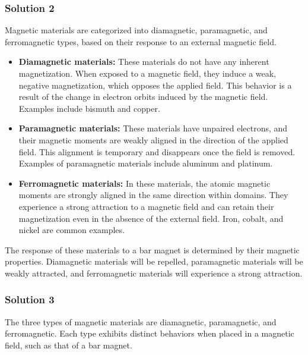 \documentclass{article}
\begin{document}
\subsubsection{Solution 2}

Magnetic materials are categorized into diamagnetic, paramagnetic, and ferromagnetic types, based on their response to an external magnetic field.

\begin{itemize}
    \item \textbf{Diamagnetic materials:} These materials do not have any inherent magnetization. When exposed to a magnetic field, they induce a weak, negative magnetization, which opposes the applied field. This behavior is a result of the change in electron orbits induced by the magnetic field. Examples include bismuth and copper.
    \item \textbf{Paramagnetic materials:} These materials have unpaired electrons, and their magnetic moments are weakly aligned in the direction of the applied field. This alignment is temporary and disappears once the field is removed. Examples of paramagnetic materials include aluminum and platinum.
    \item \textbf{Ferromagnetic materials:} In these materials, the atomic magnetic moments are strongly aligned in the same direction within domains. They experience a strong attraction to a magnetic field and can retain their magnetization even in the absence of the external field. Iron, cobalt, and nickel are common examples.
\end{itemize}

The response of these materials to a bar magnet is determined by their magnetic properties. Diamagnetic materials will be repelled, paramagnetic materials will be weakly attracted, and ferromagnetic materials will experience a strong attraction.

\subsubsection{Solution 3}

The three types of magnetic materials are diamagnetic, paramagnetic, and ferromagnetic. Each type exhibits distinct behaviors when placed in a magnetic field, such as that of a bar magnet.
\end{document}
